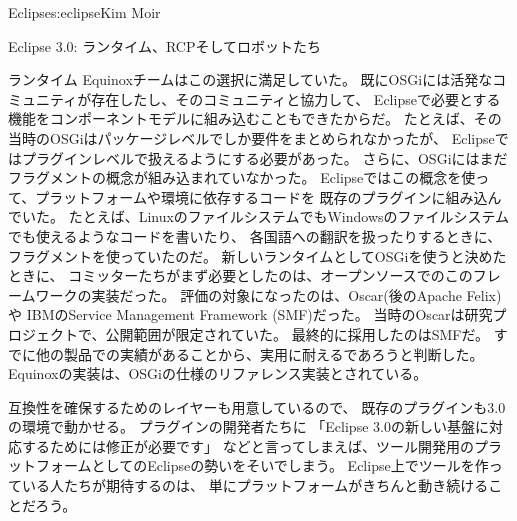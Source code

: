 \begin{aosachapter}{Eclipse}{s:eclipse}{Kim Moir}
\begin{aosasect1}{Eclipse 3.0: ランタイム、RCPそしてロボットたち}
\begin{aosasect2}{ランタイム}
Equinoxチームはこの選択に満足していた。
既にOSGiには活発なコミュニティが存在したし、そのコミュニティと協力して、
Eclipseで必要とする機能をコンポーネントモデルに組み込むこともできたからだ。
たとえば、その当時のOSGiはパッケージレベルでしか要件をまとめられなかったが、
Eclipseではプラグインレベルで扱えるようにする必要があった。
さらに、OSGiにはまだフラグメントの概念が組み込まれていなかった。
Eclipseではこの概念を使って、プラットフォームや環境に依存するコードを
既存のプラグインに組み込んでいた。
たとえば、LinuxのファイルシステムでもWindowsのファイルシステムでも使えるようなコードを書いたり、
各国語への翻訳を扱ったりするときに、フラグメントを使っていたのだ。
新しいランタイムとしてOSGiを使うと決めたときに、
コミッターたちがまず必要としたのは、オープンソースでのこのフレームワークの実装だった。
評価の対象になったのは、Oscar(後のApache Felix)や
IBMのService Management Framework (SMF)だった。
当時のOscarは研究プロジェクトで、公開範囲が限定されていた。
最終的に採用したのはSMFだ。
すでに他の製品での実績があることから、実用に耐えるであろうと判断した。
Equinoxの実装は、OSGiの仕様のリファレンス実装とされている。

互換性を確保するためのレイヤーも用意しているので、
既存のプラグインも3.0の環境で動かせる。
プラグインの開発者たちに
「Eclipse 3.0の新しい基盤に対応するためには修正が必要です」
などと言ってしまえば、ツール開発用のプラットフォームとしてのEclipseの勢いをそいでしまう。
Eclipse上でツールを作っている人たちが期待するのは、
単にプラットフォームがきちんと動き続けることだろう。


\end{aosasect2}
\end{aosasect1}
\end{aosachapter}
